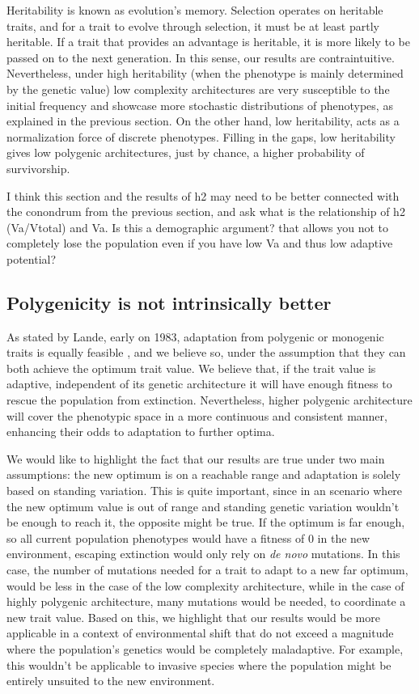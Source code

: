 \documentclass{article}
\begin{document}
Heritability is known as evolution's memory.  Selection operates on heritable traits, and for a trait to evolve through selection, it must be at least partly heritable. If a trait that provides an advantage is heritable, it is more likely to be passed on to the next generation.  In this sense, our results are contraintuitive. Nevertheless, under high heritability (when the phenotype is mainly determined by the genetic value) low complexity architectures are very susceptible to the initial frequency and showcase more stochastic distributions of phenotypes, as explained in the previous section. On the other hand, low heritability, acts as a normalization force of discrete phenotypes. Filling in the gaps, low heritability gives low polygenic architectures, just by chance, a higher probability of survivorship.

I think this section and the results of h2 may need to be better connected with the conondrum from the previous section, and ask what is the relationship of h2 (Va/Vtotal) and Va. 
Is this a demographic argument? that allows you not to completely lose the population even if you have low Va and thus low adaptive potential?

\subsection{Polygenicity is not intrinsically better}

As stated by Lande, early on 1983, adaptation from polygenic or monogenic traits is equally feasible  \citep{Lande1983-kz}, and we believe so, under the assumption that they can both achieve the optimum trait value. We believe that, if the trait value is adaptive, independent of its genetic architecture it will have enough fitness to rescue the population from extinction. Nevertheless, higher polygenic architecture will cover the phenotypic space in a more continuous and consistent manner, enhancing their odds to adaptation to further optima. 

We would like to highlight the fact that our results are true under two main assumptions: the new optimum is on a reachable range and adaptation is solely based on standing variation. This is quite important, since in an scenario where the new optimum value is out of range and standing genetic variation wouldn't be enough to reach it, the opposite might be true. If the optimum is far enough, so all current population phenotypes would have a fitness of 0 in the new environment, escaping extinction would only rely on \textit{de novo} mutations. In this case, the number of mutations needed for a trait to adapt to a new far optimum, would be less in the case of the low complexity architecture, while in the case of highly polygenic architecture, many mutations would be needed, to coordinate a new trait value. Based on this, we highlight that our results would be more applicable in a context of environmental shift that do not exceed a magnitude where the population's genetics would be completely maladaptive. For example, this wouldn't be applicable to invasive species where the population might be entirely unsuited to the new environment. 
\end{document}
